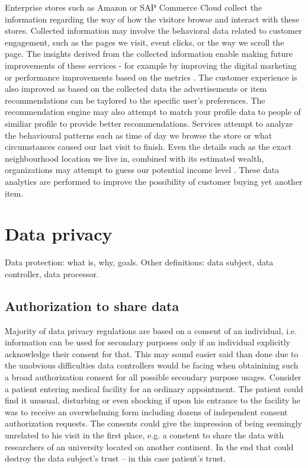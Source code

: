\documentclass[a4paper,twoside,12pt]{book}
\begin{document}
Enterprise stores such as Amazon or SAP Commerce Cloud collect the information regarding the way of how the visitors browse and interact with these stores. Collected information may involve the behavioral data related to customer engagement, such as the pages we visit, event clicks, or the way we scroll the page. The insights derived from the collected information enable making future improvements of these services - for example by improving the digital marketing or performance improvements based on the metrics \cite{bib:sap}. The customer experience is also improved as based on the collected data the advertisements or item recommendations can be taylored to the specific user's preferences. The recommendation engine may also attempt to match your profile data to people of similiar profile to provide better recommendations. Services attempt to analyze the behavioural patterns such as time of day we browse the store or what circumstances caused our last visit to finish. Even the details such as the exact neighbourhood location we live in, combined with its estimated wealth, organizations may attempt to guess our potential income level \cite{bib:big_data_in_practice}. These data analytics are performed to improve the possibility of customer buying yet another item.





\section{Data privacy}

\color{blue}
Data protection: what is, why, goals.
Other definitions: data subject, data controller, data processor.
\color{black}

\subsection{Authorization to share data}
Majority of data privacy regulations are based on a consent of an individual, i.e. information can be used for secondary purposes only if an individual explicitly acknowledge their consent for that. This may sound easier said than done due to the unobvious difficulties data controllers would be facing when obtainining such a broad authorization consent for all possible secondary purpose usages. Consider a patient entering medical facility for an ordinary appointment. The patient could find it unusual, disturbing or even shocking if upon his entrance to the facility he was to receive an overwhelming form including dozens of independent consent authorization requests. The consents could give the impression of being seemingly unrelated to his visit in the first place, e.g. a constent to share the data with researchers of an university located on another continent. In the end that could destroy the data subject's trust – in this case patient's trust.
\end{document}
